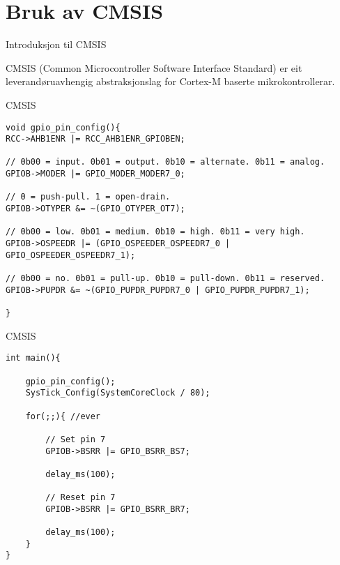\section{Bruk av CMSIS}

\begin{frame}{Introduksjon til CMSIS}
	
	CMSIS (Common Microcontroller Software Interface Standard) er eit leverandøruavhengig abstraksjonslag for Cortex-M baserte mikrokontrollerar.
	
\end{frame}




\begin{frame}[containsverbatim]{CMSIS}
		

\begin{verbatim}
void gpio_pin_config(){
RCC->AHB1ENR |= RCC_AHB1ENR_GPIOBEN;
	
// 0b00 = input. 0b01 = output. 0b10 = alternate. 0b11 = analog.
GPIOB->MODER |= GPIO_MODER_MODER7_0;
	
// 0 = push-pull. 1 = open-drain.
GPIOB->OTYPER &= ~(GPIO_OTYPER_OT7);
	
// 0b00 = low. 0b01 = medium. 0b10 = high. 0b11 = very high.
GPIOB->OSPEEDR |= (GPIO_OSPEEDER_OSPEEDR7_0 | GPIO_OSPEEDER_OSPEEDR7_1);
	
// 0b00 = no. 0b01 = pull-up. 0b10 = pull-down. 0b11 = reserved.
GPIOB->PUPDR &= ~(GPIO_PUPDR_PUPDR7_0 | GPIO_PUPDR_PUPDR7_1);
	
}
\end{verbatim}
	
\end{frame}

\begin{frame}[containsverbatim]{CMSIS}
	
\begin{verbatim}
int main(){
	
	gpio_pin_config();
	SysTick_Config(SystemCoreClock / 80);
	
	for(;;){ //ever
		
		// Set pin 7
		GPIOB->BSRR |= GPIO_BSRR_BS7;
		
		delay_ms(100);
		
		// Reset pin 7
		GPIOB->BSRR |= GPIO_BSRR_BR7;
		
		delay_ms(100);
	}
}
\end{verbatim}
	
\end{frame}

